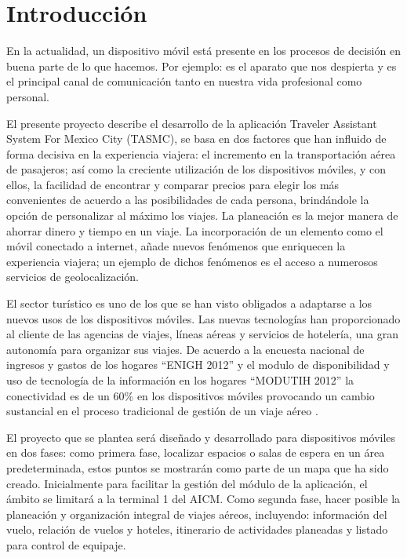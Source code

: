 
\chapter{Introducción} %

\label{Introduccion} %



En la actualidad, un dispositivo móvil está presente en los procesos de decisión en buena parte de lo que hacemos. Por ejemplo: es el aparato que nos despierta\cite{celularDespertador} y es el principal canal de comunicación tanto en nuestra vida profesional como personal.

El presente proyecto describe el desarrollo de la aplicación Traveler Assistant System For Mexico City (TASMC), se basa en dos factores que han influido de forma decisiva en la experiencia viajera: el incremento en la transportación aérea de pasajeros; así como la creciente utilización de los dispositivos móviles, y con ellos, la facilidad de encontrar y comparar precios para elegir los más convenientes de acuerdo a las posibilidades de cada persona, brindándole la opción de personalizar al máximo los viajes. La planeación es la mejor manera de ahorrar dinero y tiempo en un viaje. La incorporación de un elemento como el móvil conectado a internet, añade  nuevos fenómenos que enriquecen la experiencia viajera; un ejemplo de dichos fenómenos es el acceso a numerosos servicios de geolocalización.

El sector turístico es uno de los que se han visto obligados a adaptarse a los nuevos usos de los dispositivos móviles. Las nuevas tecnologías han proporcionado al cliente de las agencias de viajes, líneas aéreas y servicios de hotelería, una gran autonomía \cite{appsVIajar} para organizar sus viajes. De acuerdo a la encuesta nacional de ingresos y gastos de los hogares “ENIGH 2012” y el modulo de disponibilidad y uso de tecnología de la información en los hogares “MODUTIH 2012” la conectividad es de un 60\% en los dispositivos móviles provocando un cambio sustancial en el proceso tradicional de gestión de un viaje aéreo \cite{endutih}.

El proyecto que se plantea será diseñado y desarrollado para dispositivos móviles en dos fases: como primera fase, localizar espacios o salas de espera en un área predeterminada, estos puntos se mostrarán como parte de un mapa que ha sido creado. Inicialmente para facilitar la gestión del módulo de la aplicación, el ámbito se limitará a la terminal 1 del AICM. Como segunda fase, hacer posible la planeación y organización integral de viajes aéreos, incluyendo: información del vuelo, relación de vuelos y hoteles, itinerario de actividades planeadas y listado para control de equipaje.


